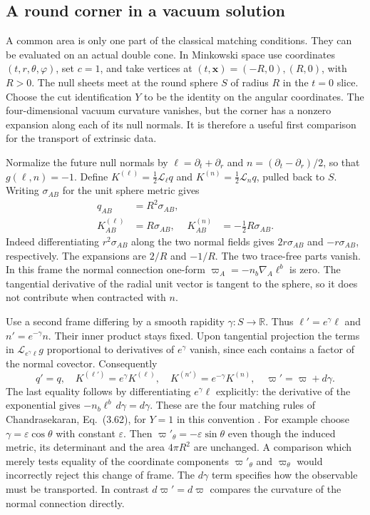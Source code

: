 \documentclass[11pt,letterpaper]{article}
\begin{document}
\subsection{A round corner in a vacuum solution}
A common area is only one part of the classical matching conditions.
They can be evaluated on an actual double cone. In Minkowski space use
coordinates \((t,r,\theta,\varphi)\), set \(c=1\), and take vertices at
\((t,\mathbf x)=(-R,0),(R,0)\), with \(R>0\).
The null sheets meet at the round sphere \(S\) of radius \(R\) in the
\(t=0\) slice. Choose the cut identification \(Y\) to be the identity on
the angular coordinates. The four-dimensional vacuum curvature vanishes,
but the corner has a nonzero expansion along each of its null normals.
It is therefore a useful first comparison for the transport of extrinsic
data.

Normalize the future null normals by
\(\ell=\partial_t+\partial_r\) and
\(n=(\partial_t-\partial_r)/2\), so that \(g(\ell,n)=-1\).
Define \(K^{(\ell)}=\tfrac12\mathcal L_\ell q\) and
\(K^{(n)}=\tfrac12\mathcal L_n q\), pulled back to \(S\).
Writing \(\sigma_{AB}\) for the unit sphere metric gives
\begin{align}
 q_{AB}&=R^2\sigma_{AB},\\
 K^{(\ell)}_{AB}&=R\sigma_{AB},&
 K^{(n)}_{AB}&=-\tfrac12 R\sigma_{AB}.
 \label{eq:round-corner}
\end{align}
Indeed differentiating \(r^2\sigma_{AB}\) along the two normal fields
gives \(2r\sigma_{AB}\) and \(-r\sigma_{AB}\), respectively.
The expansions are \(2/R\) and \(-1/R\). The two trace-free parts vanish.
In this frame the normal connection one-form
\(\varpi_A=-n_b\nabla_A\ell^b\) is zero. The tangential derivative of the
radial unit vector is tangent to the sphere, so it does not contribute
when contracted with \(n\).

Use a second frame differing by a smooth rapidity
\(\gamma:S\to\mathbb R\). Thus \(\ell'=e^\gamma\ell\) and
\(n'=e^{-\gamma}n\). Their inner product stays fixed. Upon tangential
projection the terms in \(\mathcal L_{e^\gamma\ell}g\) proportional to
derivatives of \(e^\gamma\) vanish, since each contains a factor of the
normal covector. Consequently
\begin{equation}
 q'=q,\quad K^{(\ell')}=e^\gamma K^{(\ell)},\quad
 K^{(n')}=e^{-\gamma}K^{(n)},\quad
 \varpi'=\varpi+d\gamma .
 \label{eq:boost}
\end{equation}
The last equality follows by differentiating \(e^\gamma\ell\) explicitly:
the derivative of the exponential gives
\(-n_b\ell^b\,d\gamma=d\gamma\).
These are the four matching rules of Chandrasekaran, Eq.~(3.62), for
\(Y=1\) in this convention \cite{nc}.
For example choose \(\gamma=\varepsilon\cos\theta\) with constant
\(\varepsilon\). Then
\(\varpi'_\theta=-\varepsilon\sin\theta\) even though the induced metric,
its determinant and the area \(4\pi R^2\) are unchanged. A comparison
which merely tests equality of the coordinate components
\(\varpi'_\theta\) and \(\varpi_\theta\) would incorrectly reject this
change of frame. The \(d\gamma\) term specifies how the observable must be
transported. In contrast \(d\varpi'=d\varpi\) compares the curvature of
the normal connection directly.
\end{document}
